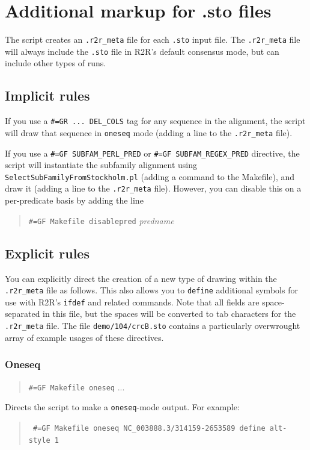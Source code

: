 \documentclass[letterpaper,12pt]{report}
\newcommand{\example}[1]{
\begin{quote}
{\raggedright
#1
}
\end{quote}
}
\newcommand{\examplett}[1]{
\example{{\tt #1}}
}
\begin{document}
\section{Additional markup for .sto files}

The script creates an {\tt .r2r\_meta} file for each {\tt .sto} input file.
The {\tt .r2r\_meta} file will always include the {\tt .sto} file in R2R's default consensus mode,
but can include other types of runs.

\subsection{Implicit rules}

If you use a {\tt \#=GR ... DEL\_COLS} tag for any sequence in the alignment,
the script will draw that sequence in {\tt oneseq} mode (adding a line to the {\tt .r2r\_meta} file).

If you use a {\tt \#=GF SUBFAM\_PERL\_PRED} or {\tt \#=GF SUBFAM\_REGEX\_PRED} directive,
the script will instantiate the subfamily alignment using {\tt SelectSubFamilyFromStockholm.pl} (adding a command
to the Makefile),
and draw it (adding a line to the {\tt .r2r\_meta} file).
However, you can disable this on a per-predicate basis by adding the line
\example{
{\tt \#=GF Makefile disablepred} {\it predname}
}

\subsection{Explicit rules}

You can explicitly direct the creation of a new type of drawing within the {\tt .r2r\_meta} file as follows.
This also allows you to {\tt define} additional symbols for use with R2R's {\tt ifdef} and related commands.
Note that all fields are space-separated in this file, but the spaces will be converted to tab characters
for the {\tt .r2r\_meta} file.
The file {\tt demo/104/crcB.sto} contains a particularly overwrought array of example usages
of these directives.

\subsubsection{Oneseq}

\example{
{\tt \#=GF Makefile oneseq} ...
}
Directs the script to make a {\tt oneseq}-mode output.  For example:
\examplett{
\#=GF Makefile oneseq NC\_003888.3/314159-2653589 define alt-style 1
}
\end{document}
